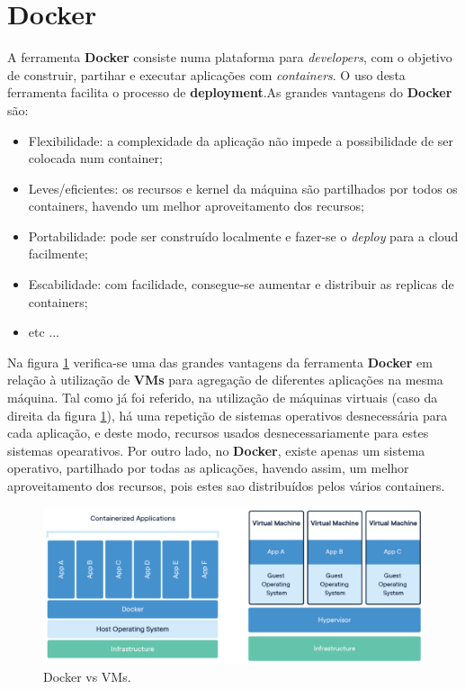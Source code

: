 \section{Docker}
A ferramenta \textbf{Docker} consiste numa plataforma para \emph{developers}, com o objetivo de construir, partihar e executar aplicações com \emph{containers}. O uso desta ferramenta facilita o processo de \textbf{deployment}.\newline As grandes vantagens do \textbf{Docker} são: 
\begin{itemize}
    \item Flexibilidade: a complexidade da aplicação não impede a possibilidade de ser colocada num container;
    \item Leves/eficientes: os recursos e kernel da máquina são partilhados por todos os containers, havendo um melhor aproveitamento dos recursos;
    \item Portabilidade: pode ser construído localmente e fazer-se o \emph{deploy} para a cloud facilmente;
    \item Escabilidade: com facilidade, consegue-se aumentar e distribuir as replicas de containers;
    \item etc ...
\end{itemize}{} 

Na figura \ref{img:docker} verifica-se uma das grandes vantagens da ferramenta \textbf{Docker} em relação à utilização de \textbf{VMs} para agregação de diferentes aplicações na mesma máquina. \newline
Tal como já foi referido, na utilização de máquinas virtuais (caso da direita da figura \ref{img:docker}), há uma repetição de sistemas operativos desnecessária para cada aplicação, e deste modo, recursos usados desnecessariamente para estes sistemas opearativos. \newline Por outro lado, no \textbf{Docker}, existe apenas um sistema operativo, partilhado por todas as aplicações, havendo assim, um melhor aproveitamento dos recursos, pois estes sao distribuídos pelos vários containers.



\begin{figure}[h!]
\includegraphics[scale=0.50]{images/docker.png}
\caption{Docker vs VMs.}
\centering
\label{img:docker}
\end{figure}
\newpage

